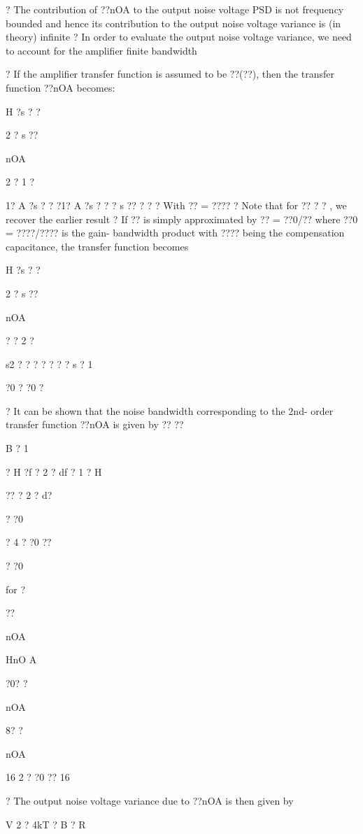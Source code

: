 \documentclass[2pt,landscape]{article}
\begin{document}
\begin{multicols*}{5}
?	The contribution of ??nOA to the output noise voltage PSD is not 
frequency bounded and hence its contribution to the output noise 
voltage variance is (in theory) infinite
?		In order to evaluate the output noise voltage variance, we need 
to account for the amplifier finite bandwidth


?	If the amplifier transfer function is assumed to be ??(??), then the 
transfer function ??nOA becomes:


H	?s ? ?


2 ? s ??	


nOA


2	?	1	?


1? A ?s ? ? ?1? A ?s ? ? ? s ??
?	?
?	With ?? = ????
?	Note that for ?? ? ? , we recover the earlier result
?	If ?? is simply approximated by ?? = ??0/?? where ??0 = ????/???? is the gain- 
bandwidth product with ???? being the compensation capacitance, the 
transfer function becomes


H	?s ? ?


2 ? s ??	


nOA


?	? 2	?


s2 ?	? ?	? ? ? ? s ? 1

?0	? ?0	?





?	It can be shown that the noise bandwidth corresponding to the 2nd- 
order transfer function ??nOA is given by
??	??


B	?	1


?	H	?f ? 
2 ? df ?	1 ?	H




?? ? 2 ? d?


? ?0


? 4 ? ?0 ??


? ?0


for ?


?? 


nOA


HnO
A


?0? ?


nOA


8?	?


nOA


16	2 ? ?0 ??	16



?	The output noise voltage variance due to ??nOA is then given by



V 2	? 4kT ? B	? R



\end{multicols*}
\end{document}
